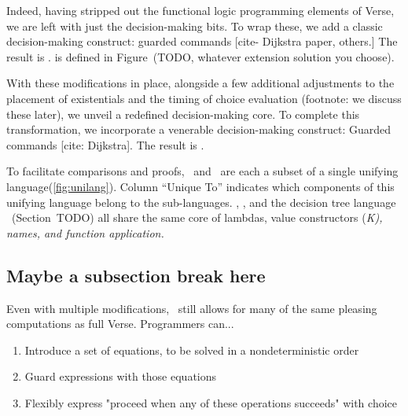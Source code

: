 \documentclass[manuscript,screen,review, 12pt]{acmart}
\begin{document}
        Indeed, having stripped out the functional logic programming elements of
        Verse, we are left with just the decision-making bits. To wrap these, we
        add a classic decision-making construct: guarded commands [cite-
        Dijkstra paper, others.] The result is \VMinus. \VMinus is defined in 
        Figure~(TODO, whatever extension solution you choose). 

        
        
        
        
        With these modifications in place, alongside a few additional
        adjustments to the placement of existentials and the timing of choice
        evaluation (footnote: we discuss these later), we unveil a redefined decision-making core. To complete this
        transformation, we incorporate a venerable decision-making construct:
        Guarded commands [cite: Dijkstra]. The result is \VMinus. 

    

    To facilitate comparisons and proofs, \VMinus\ and \PPlus\ are each a subset
    of a single unifying language(\cref{fig:unilang}). Column “Unique To” indicates
    which components of this unifying language belong to the sub-languages. 
    \PPlus, \VMinus, and the decision tree language \D\ (Section~TODO) all share 
    the same core of lambdas, value constructors (\it{K}), names, and function 
    application. 


    

    
    
    
    



    \subsection{Maybe a subsection break here}
    
    
    
    Even with multiple modifications, \VMinus\ still allows for many of the same
    pleasing computations as full Verse. Programmers can... 
        \begin{enumerate}
            \item Introduce a set of equations, to be solved in a nondeterministic order 
            \item Guard expressions with those equations 
            \item Flexibly express "proceed when any of these operations succeeds" with choice 
        \end{enumerate}
\end{document}
